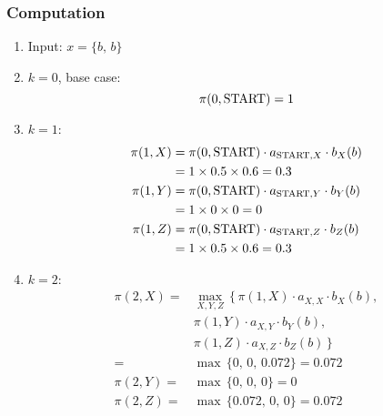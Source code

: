 \documentclass[9pt,twocolumn]{article}
\newcommand{\START}{\text{\lstinline{START}}}
\begin{document}
        \subsubsection*{Computation}

            \begin{enumerate}
                \item Input: $x = \{b,\,b\}$
                \item
                    $k=0$, base case:
                    \begin{equation}
                        \pi(0, \START) = 1    
                    \end{equation}
                \item
                    $k=1$:
                    \begin{equation}
                    \begin{split}
                        \pi(1, X) & = \pi(0, \START) \cdot a_{\START,X} \cdot b_X(b)\\
                        & = 1 \times 0.5 \times 0.6 = 0.3 \\
                        \pi(1, Y) & = \pi(0, \START) \cdot a_{\START,Y} \cdot b_Y(b)\\
                        & = 1 \times 0 \times 0 = 0 \\
                        \pi(1, Z) & = \pi(0, \START) \cdot a_{\START,Z} \cdot b_Z(b)\\
                        & = 1 \times 0.5 \times 0.6 = 0.3
                    \end{split}
                    \end{equation}
                \item
                    $k=2$:
                    \begin{equation}
                    \begin{split}
                        \pi(2, X) = & \max_{X,Y,Z}\,\{\, \pi(1, X) \cdot a_{X,X} \cdot b_X(b),\\
                        & \pi(1, Y) \cdot a_{X,Y} \cdot b_Y(b),\\
                        & \pi(1, Z) \cdot a_{X,Z} \cdot b_Z(b) \,\}\\
                        = & \max\,\{0,\,0,\,0.072\} = 0.072\\
                        \pi(2, Y) = & \max\,\{0,\,0,\,0\} = 0\\
                        \pi(2, Z) = & \max\,\{0.072,\,0,\,0\} = 0.072\\
                    \end{split}
                    \end{equation}


\end{enumerate}
\end{document}
